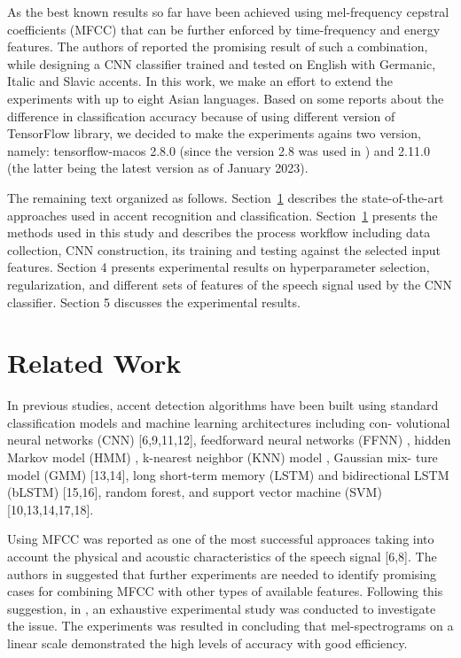 \documentclass[ams]{U-AizuGT}
\begin{document}
As the best known results so far have been achieved using mel-frequency cepstral coefficients (MFCC) that can be further enforced by time-frequency and energy features. The authors of \cite{Veranika:lang} reported the promising result of such a combination, while designing a CNN classifier trained and tested on English with Germanic, Italic and Slavic accents.
In this work, we make an effort to extend the experiments with up to eight Asian languages. Based on some reports about the difference in classification accuracy because of using different version of TensorFlow library, we decided to make the experiments agains two version, namely: tensorflow-macos 2.8.0 (since the version 2.8 was used in \cite{Veranika:lang}) and 2.11.0 (the latter being the latest version as of January 2023).\par
The remaining text organized as follows. Section~\ref{sec:related-work} describes the state-of-the-art approaches used in accent recognition and classification. Section~\ref{sec:related-work} presents the methods used in this study and describes the process workflow including data collection, CNN construction, its training and testing against the selected input features. Section 4 presents experimental results on hyperparameter selection, regularization, and different sets of features of the speech signal used by the CNN classifier. Section 5 discusses the experimental results.

\section{Related Work}
\label{sec:related-work}
In previous studies, accent detection algorithms have been built using standard classification models and machine learning architectures including con- volutional neural networks (CNN) [6,9,11,12], feedforward neural networks (FFNN) \cite{Tverdokhleb:imp}, hidden Markov model (HMM) \cite{Bird:acc}, k-nearest neighbor (KNN) model \cite{Krishna:asy}, Gaussian mix- ture model (GMM) [13,14], long short-term memory (LSTM) and bidirectional LSTM (bLSTM) [15,16], random forest, and support vector machine (SVM) [10,13,14,17,18]. \par 
Using MFCC was reported as one of the most successful approaces taking into account the physical and acoustic characteristics of the speech signal [6,8]. The authors in \cite{Singh:fea} suggested that further experiments are needed to identify promising cases for combining MFCC with other types of available features. Following this suggestion, in  \cite{Veranika:lang}, an exhaustive experimental study was conducted to investigate the issue. The experiments was resulted in concluding that mel-spectrograms on a linear scale demonstrated the high levels of accuracy with good efficiency.
\end{document}
